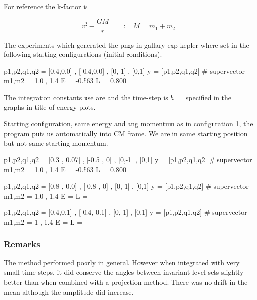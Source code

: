 \documentclass[12pt]{article}
\begin{document}
For reference the k-factor is 

\begin{equation}
    v^2 - \frac{G M}{r}\qquad:\quad M = m_1+m_2
\end{equation}

The experiments which generated the pngs in gallary exp kepler where set in the following starting configurations (initial conditions).

\begin{python}
p1,p2,q1,q2 = [0.4,0.0] , [-0.4,0.0] , [0,-1] , [0,1]
y = [p1,p2,q1,q2] # supervector
m1,m2 = 1.0 , 1.4
E = -0.563
L = 0.800
\end{python}

The integration constants use are  and the time-step is $h =$  specified in the graphs in title of energy plots.

Starting configuration, same energy and ang momentum as in configuration 1, the program puts us automatically into CM frame. We are in same starting position but not same starting momentum.

\begin{python}
p1,p2,q1,q2 = [0.3 , 0.07] , [-0.5 , 0] , [0,-1] , [0,1]
y = [p1,p2,q1,q2] # supervector
m1,m2 = 1.0 , 1.4
E = -0.563
L = 0.800
\end{python}


\begin{python}
p1,p2,q1,q2 = [0.8 , 0.0] , [-0.8 , 0] , [0,-1] , [0,1]
y = [p1,p2,q1,q2] # supervector
m1,m2 = 1.0 , 1.4
E = 
L = 
\end{python}


\begin{python}
p1,p2,q1,q2 = [0.4,0.1] , [-0.4,-0.1] , [0,-1] , [0,1]
y = [p1,p2,q1,q2] # supervector
m1,m2 = 1 , 1.4
E = 
L =
\end{python}


\subsubsection{Remarks}

The method performed poorly in general. However when integrated with very small time steps, it did conserve the angles between invariant level sets slightly better than when combined with a projection method. There was no drift in the mean although the amplitude did increase. 
\end{document}

